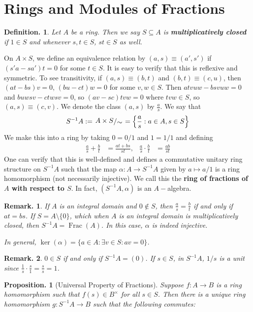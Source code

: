 \documentclass[11pt, a4paper]{memoir}
\theoremstyle{change}
\newtheorem{proposition}[theorem]{Proposition.}
\theoremstyle{plain}
\theoremstyle{nonumberplain}
\newtheorem{definition}{Definition.}
\newtheorem{remark}{Remark.}
\DeclareMathOperator{\Frac}{Frac}
\newcommand{\quot}[2]{\mathchoice{\left.\raisebox{0.10em}{$#1$}\middle/\raisebox{-0.10em}{$#2$}\right.}
                                 {\left.\raisebox{0.04em}{$#1$}\middle/\raisebox{-0.04em}{$#2$}\right.}
                                 {\left.\raisebox{0.01em}{$#1$}\middle/\raisebox{-0.01em}{$#2$}\right.}
                                 {\left.\raisebox{0em}{$#1$}\middle/\raisebox{0em}{$#2$}\right.}}
\numberwithin{equation}{section}
\begin{document}
\section{Rings and Modules of Fractions}
\begin{definition}
    Let $A$ be a ring.
    Then we say $S\subseteq A$ is \textbf{multiplicatively closed} if $1\in S$ and whenever $s,t\in S$, $st\in S$ as well.
\end{definition}
On $A\times S$, we define an equivalence relation by $(a,s)\equiv(a',s')$ if $(s'a-sa')t=0$ for some $t\in S$.
It is easy to verify that this is reflexive and symmetric.
To see transitivity, if $(a,s)\equiv(b,t)$ and $(b,t)\equiv(c,u)$, then $(at-bs)v=0$, $(bu-ct)w=0$ for some $v,w\in S$.
Then $atvuw-bsvuw=0$ and $buwsv-ctwsv=0$, so $(av-sc)tvw=0$ where $tvw\in S$, so $(a,s)\equiv(c,v)$.
We denote the class $(a,s)$ by $\frac{a}{s}$.
We say that
\begin{equation*}
    S^{-1}A:=\quot{A\times S}{\sim}=\left\{\frac{a}{s}:a\in A,s\in S\right\}
\end{equation*}
We make this into a ring by taking $0=0/1$ and $1=1/1$ and defining
\begin{align*}
    \frac{a}{s}+\frac{b}{t}&=\frac{at+bs}{st},&\frac{a}{s}\cdot\frac{b}{t}&=\frac{ab}{st}
\end{align*}
One can verify that this is well-defined and defines a commutative unitary ring structure on $S^{-1}A$ such that the map $\alpha:A\to S^{-1}A$ given by $a\mapsto a/1$ is a ring homomorphism (not necessarily injective).
We call this the \textbf{ring of fractions of $A$ with respect to $S$}.
In fact, $(S^{-1}A,\alpha)$ is an $A-$algebra.
\begin{remark}
    If $A$ is an integral domain and $0\notin S$, then $\frac{a}{s}=\frac{b}{t}$ if and only if $at=bs$.
    If $S=A\setminus\{0\}$, which when $A$ is an integral domain is multiplicatively closed, then $S^{-1}A=\Frac(A)$.
    In this case, $\alpha$ is indeed injective.

    In general, $\ker(\alpha)=\{a\in A:\exists v\in S:av=0\}$.
\end{remark}
\begin{remark}
    $0\in S$ if and only if $S^{-1}A=(0)$.
    If $s\in S$, in $S^{-1}A$, $1/s$ is a unit since $\frac{1}{s}\cdot\frac{s}{1}=\frac{s}{s}=1$.
\end{remark}
\begin{proposition}[Universal Property of Fractions]
    Suppose $f:A\to B$ is a ring homomorphism such that $f(s)\in B^\times$ for all $s\in S$.
    Then there is a unique ring homomorphism $g:S^{-1}A\to B$ such that the following commutes:
    \begin{center}
    \end{center}
\end{proposition}
\end{document}
